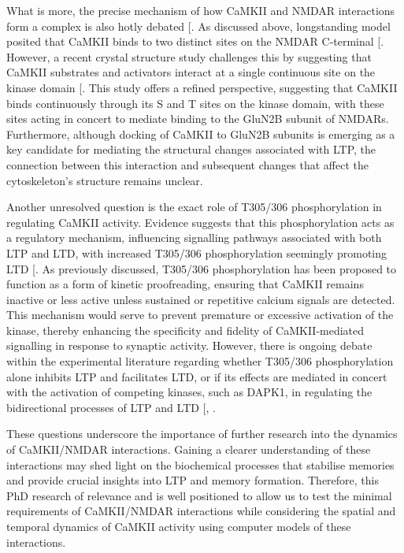 \documentclass[
  11pt,
  letterpaper,
]{scrreprt}
\begin{document}
What is more, the precise mechanism of how CaMKII and NMDAR interactions
form a complex is also hotly debated
{[}\citeproc{ref-ozden2022CaMKII}{169}{]}. As discussed above,
longstanding model posited that CaMKII binds to two distinct sites on
the NMDAR C-terminal {[}\citeproc{ref-bayer2001Interaction}{168}{]}.
However, a recent crystal structure study challenges this by suggesting
that CaMKII substrates and activators interact at a single continuous
site on the kinase domain {[}\citeproc{ref-ozden2022CaMKII}{169}{]}.
This study offers a refined perspective, suggesting that CaMKII binds
continuously through its S and T sites on the kinase domain, with these
sites acting in concert to mediate binding to the GluN2B subunit of
NMDARs. Furthermore, although docking of CaMKII to GluN2B subunits is
emerging as a key candidate for mediating the structural changes
associated with LTP, the connection between this interaction and
subsequent changes that affect the cytoskeleton's structure remains
unclear.

Another unresolved question is the exact role of T305/306
phosphorylation in regulating CaMKII activity. Evidence suggests that
this phosphorylation acts as a regulatory mechanism, influencing
signalling pathways associated with both LTP and LTD, with increased
T305/306 phosphorylation seemingly promoting LTD
{[}\citeproc{ref-cook2021CaMKIIb}{198}{]}. As previously discussed,
T305/306 phosphorylation has been proposed to function as a form of
kinetic proofreading, ensuring that CaMKII remains inactive or less
active unless sustained or repetitive calcium signals are detected. This
mechanism would serve to prevent premature or excessive activation of
the kinase, thereby enhancing the specificity and fidelity of
CaMKII-mediated signalling in response to synaptic activity. However,
there is ongoing debate within the experimental literature regarding
whether T305/306 phosphorylation alone inhibits LTP and facilitates LTD,
or if its effects are mediated in concert with the activation of
competing kinases, such as DAPK1, in regulating the bidirectional
processes of LTP and LTD {[},
\citeproc{ref-goodell2017DAPK1}{222}{]}.

These questions underscore the importance of further research into the
dynamics of CaMKII/NMDAR interactions. Gaining a clearer understanding
of these interactions may shed light on the biochemical processes that
stabilise memories and provide crucial insights into LTP and memory
formation. Therefore, this PhD research of relevance and is well
positioned to allow us to test the minimal requirements of CaMKII/NMDAR
interactions while considering the spatial and temporal dynamics of
CaMKII activity using computer models of these interactions.
\end{document}
